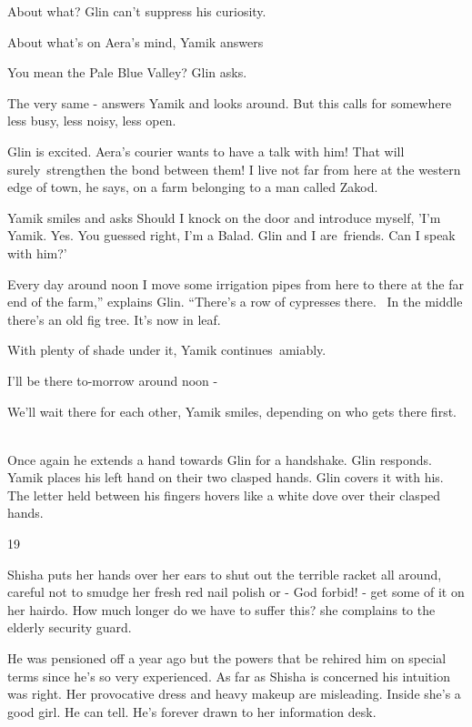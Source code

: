 \documentclass[twoside,11pt]{book}
\begin{document}
{\textquotedbl}About what?{\textquotedbl} Glin can't suppress his curiosity.

{\textquotedbl}About what's on Aera's mind,{\textquotedbl} Yamik answers 

{\textquotedbl}You mean the Pale Blue Valley?{\textquotedbl} Glin asks. 

{\textquotedbl}The very same -{\textquotedbl} answers Yamik and looks around. {\textquotedbl}But this calls for
somewhere less busy, less noisy, less open.{\textquotedbl} 

Glin is excited.  Aera's courier wants to have a talk with him! That will surely\ strengthen the bond between them!
{\textquotedbl}I live not far from here at the western edge of town,{\textquotedbl} he says, {\textquotedbl}on a farm
belonging to a man called Zakod.{\textquotedbl} 

Yamik smiles and asks {\textquotedbl}Should I knock on the door and introduce myself, 'I'm Yamik. Yes. You guessed
right, I'm a Balad. Glin and I are~friends. Can I speak with him?{}'{\textquotedbl} 

{\textquotedbl}Every day around noon I move some irrigation pipes from here to there at the far end of the farm,''
explains Glin. ``There's a row of cypresses there. ~In the middle there's an old fig tree. It's now in
leaf.{\textquotedbl} 

{\textquotedbl}With plenty of shade under it,{\textquotedbl} Yamik continues~amiably. 

{\textquotedbl}I'll be there to-morrow around noon -{\textquotedbl}

{\textquotedbl}We'll wait there for each other,{\textquotedbl} Yamik smiles, {\textquotedbl}depending on who gets there
first.{\textquotedbl} ~

Once again he extends a hand towards Glin for a handshake. Glin responds. Yamik places his left hand on their two
clasped hands. Glin covers it with his. The letter held between his fingers hovers like a white dove over their clasped
hands.


\bigskip

19\ 

Shisha puts her hands over her ears to shut out the terrible racket all around, careful not to smudge her fresh red nail
polish or - God forbid! - get some of it on her hairdo. {\textquotedbl}How much longer do we have to suffer
this?{\textquotedbl} she complains to the elderly security guard.

He was pensioned off a year ago but the powers that be rehired him on special terms since he's so very experienced. As
far as Shisha is concerned his intuition was right. Her provocative dress and heavy makeup are misleading. Inside she's
a good girl. He can tell. He{}'s forever drawn to her information desk.
\end{document}

